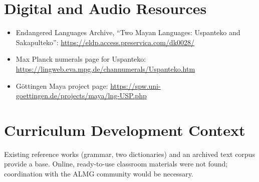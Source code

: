 \documentclass[12pt]{article}
\begin{document}
\section{Digital and Audio Resources}
\begin{itemize}
\item Endangered Languages Archive, ``Two Mayan Languages: Uspanteko and Sakapulteko'': \url{https://eldp.access.preservica.com/dk0028/}
\item Max Planck numerals page for Uspanteko: \url{https://lingweb.eva.mpg.de/channumerals/Uspanteko.htm}
\item G\"ottingen Maya project page: \url{https://spw.uni-goettingen.de/projects/maya/lng-USP.php}
\end{itemize}

\section{Curriculum Development Context}
Existing reference works (grammar, two dictionaries) and an archived text corpus provide a base. Online, ready-to-use classroom materials were not found; coordination with the ALMG community would be necessary.
\end{document}
